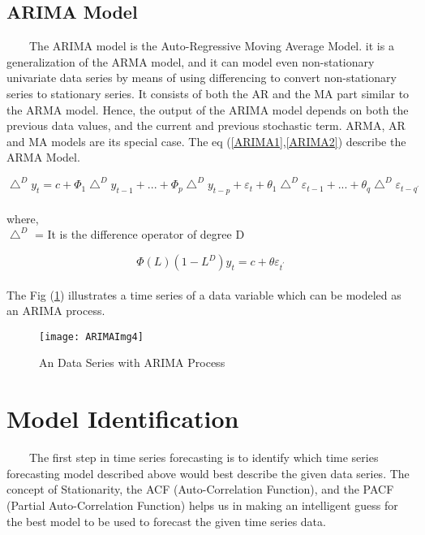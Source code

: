 \subsection{ARIMA Model}
\
\
\
\
The ARIMA model is the Auto-Regressive Moving Average Model. it is a generalization of the ARMA model, and it can model even non-stationary univariate data series by means of using differencing to convert non-stationary series to stationary series. It consists of both the AR and the MA part similar to the ARMA model. Hence, the output of the ARIMA model depends on both the previous data values, and the current and previous stochastic term. ARMA, AR and MA models are its special case.
The eq (\ref{ARIMA1},\ref{ARIMA2}) describe the ARMA Model.

\begin{equation}
\label{ARIMA1}
\bigtriangleup^{D}y_{t}= c + \Phi_{1}\bigtriangleup^{D}y_{t-1} + ... + \Phi_{p}\bigtriangleup^{D}y_{t-p} + \varepsilon_{t} +  \theta_{1}\bigtriangleup^{D}\varepsilon_{t-1} + ... + \theta_{q}\bigtriangleup^{D}\varepsilon_{t-q^{'}}
\end{equation}\\
where,\\
$ \bigtriangleup^{D} $ = It is the difference operator of degree D

\begin{equation}
\label{ARIMA2}
\Phi(L)(1-L^{D})y_{t} = c + \theta\varepsilon_{t^{'}}
\end{equation}\\

The Fig (\ref{figc7h4}) illustrates a time series of a data variable which can be modeled as an ARIMA process.

\begin{figure}[H]
\centering
\texttt{[image: ARIMAImg4]}
\caption{An Data Series with ARIMA Process}
\label{figc7h4} %
\end{figure}

\section{Model Identification}
\
\
\
\
The first step in time series forecasting is to identify which time series forecasting model described above would best describe the given data series. The concept of Stationarity, the ACF (Auto-Correlation Function), and the PACF (Partial Auto-Correlation Function) helps us in making an intelligent guess for the best model to be used to forecast the given time series data.

